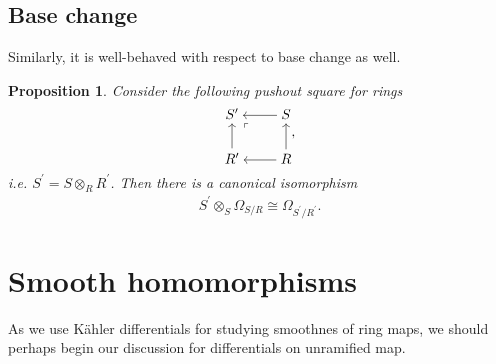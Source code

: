\documentclass[letterpaper,10pt,twoside]{amsart}
\newcommand{\isom}{\cong}
\newcommand{\tens}{\otimes}
\theoremstyle{proposition}
\newtheorem{proposition}{Proposition}[section]
\theoremstyle{definition}
\theoremstyle{theorem}
\theoremstyle{definition}
\theoremstyle{definition}
\theoremstyle{definition}
\theoremstyle{lemma}
\theoremstyle{definition}
\theoremstyle{definition}
\theoremstyle{corollary}
\theoremstyle{definition}
\begin{document}
	
	\subsection{Base change}
	Similarly, it is well-behaved with respect to base change as well.
	\begin{proposition}\label{P-Differential Base Change}
		Consider the following pushout square for rings
		\[\begin{tikzcd}[cramped]
			{S^\prime} & S \\
			{R^\prime} & R
			\arrow["\ulcorner"{anchor=center, pos=0.125}, draw=none, from=1-1, to=2-2]
			\arrow[from=1-2, to=1-1]
			\arrow[from=2-1, to=1-1]
			\arrow[from=2-2, to=1-2]
			\arrow[from=2-2, to=2-1]
		\end{tikzcd},\]
		i.e. $S^{\prime} = S\tens_{R} R^{\prime}$. Then there is a canonical isomorphism 
		\begin{align*}
			S^{\prime}\tens_{S} \Omega_{S/R} \isom \Omega_{S^{\prime}/R^{\prime}}.
		\end{align*}
	\end{proposition}

	\section{Smooth homomorphisms}
	As we use K\"ahler differentials for studying smoothnes of ring maps, we should perhaps begin our discussion for differentials on unramified map. 
\end{document}
